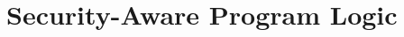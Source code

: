 \section{Security-Aware Program Logic}
\label{related-ddifc}



\begin{comment}
Hi-Star~\cite{histar} is a security-aware operating 
system that tracks and propagates security labels on processes and files. Processes with a special
declassification privilege are allowed to perform certain declassifications. We are not aware of any
formal, end-to-end noninterference guarantee for Hi-Star. 

Flume~\cite{flume} takes many ideas from Hi-Star, places them in
a more formalized and abstract setting, and provides a cleaner label model and declassification 
system. A process-level pure noninterference theorem is proved when no process with declassification 
privileges is being executed. However, Flume is forced to assume the worst about any process that
does have declassification privileges since it does not know the process's underlying code. A process
with the privilege to declassify Alice's data must be completely trusted by Alice. This is similar to
our notion of isolated method, except that the trusted base is only a few lines of code, rather than
the entirety of the code being executed by the trusted process. Additionally, our system allows for
some declassification to occur without an explicit declassification command being used~--- this kind
of declassification does not require any trusted code at all.

RESIN~\cite{resin} is actually more of a combination between an OS-level and a language-level IFC 
system. If a process needs to declassify some data, it must pass the data through a policy object.
This policy object is much like our notion of isolated method in that it contains some
trusted code (usually just a few lines) that releases the high-security data. The object also comes
with some metadata describing the conditions under which the declassification can be performed.
This metadata describes a declassification policy, in the same way that labels being conditioned
on state predicates describe a policy in our system. The primary difference between the systems is
that RESIN does not provide any formal security guarantee. We would thus imagine that, after
adding appropriate extensions to our system, we could formally verify the security of some 
programs implemented in RESIN.
\end{comment}


